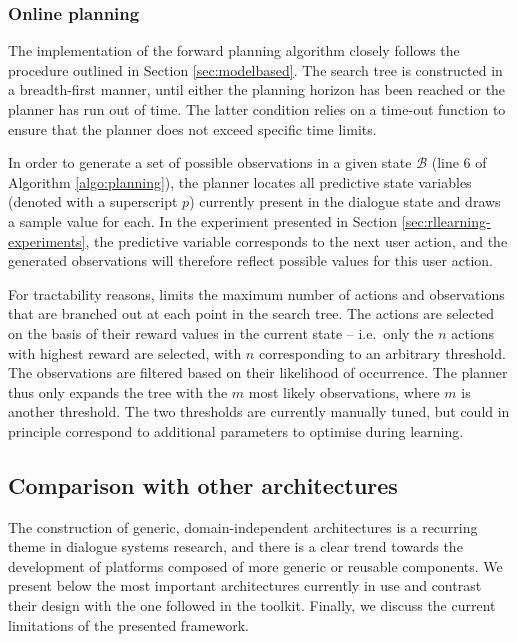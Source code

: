 \subsubsection*{Online planning}
The implementation of the forward planning algorithm closely follows the procedure outlined in Section \ref{sec:modelbased}.  The search tree is constructed in a breadth-first manner, until either the planning horizon has been reached or the planner has run out of time.  The latter condition relies on a time-out function to ensure that the planner does not exceed specific time limits.

In order to generate a set of possible observations in a given state $\mathcal{B}$ (line 6 of Algorithm \ref{algo:planning}), the planner locates all predictive state variables (denoted with a superscript $p$) currently present in the dialogue state and draws a sample value for each.  In the experiment presented in Section \ref{sec:rllearning-experiments}, the predictive variable corresponds to the next user action, and the generated observations will therefore reflect possible values for this user action.

For tractability reasons, \opendial{} limits the maximum number of actions and observations that are branched out at each point in the search tree.  The actions are selected on the basis of their reward values in the current state -- i.e.\ only the $n$ actions with highest reward are selected, with $n$ corresponding to an arbitrary threshold. The observations are filtered based on their likelihood of occurrence.  The planner thus only expands the tree with the $m$ most likely observations, where $m$ is another threshold. The two thresholds are currently manually tuned, but could in principle correspond to additional parameters to optimise during learning. 

\subsection{Comparison with other architectures}
\label{sec:archi-comparison}

The construction of generic, domain-independent architectures is a recurring theme in dialogue systems research, and there is a clear trend towards the development of platforms composed of more generic or reusable components. We present below the most important architectures currently in use and contrast their design with the one followed in the \opendial{} toolkit. Finally, we discuss the current limitations of the presented framework.

